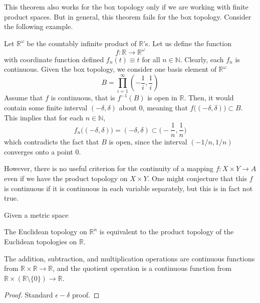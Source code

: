   This theorem also works for the box topology only if we are working with finite product spaces. But in general, this theorem fails for the box topology. Consider the following example. 

  \begin{example}
    Let $\mathbb{R}^\omega$ be the countably infinite product of $\mathbb{R}$'s. Let us define the function 
    \begin{equation}
      f: \mathbb{R} \rightarrow \mathbb{R}^\omega
    \end{equation}
    with coordinate function defined $f_n (t) \equiv t$ for all $n \in \mathbb{N}$. Clearly, each $f_n$ is continuous. Given the box topology, we consider one basis element of $\mathbb{R}^\omega$
    \begin{equation}
      B = \prod_{i=1}^\infty (-\frac{1}{i}, \frac{1}{i})
    \end{equation}
    Assume that $f$ is continuous, that is $f^{-1}(B)$ is open in $\mathbb{R}$. Then, it would contain some finite interval $(-\delta, \delta)$ about $0$, meaning that $f\big( (-\delta, \delta)\big) \subset B$. This implies that for each $n \in \mathbb{N}$, 
    \begin{equation}
      f_n \big( (-\delta, \delta) \big) = (-\delta, \delta) \subset \Big( -\frac{1}{n}, \frac{1}{n} \Big)
    \end{equation}
    which contradicts the fact that $B$ is open, since the interval $(-1/n, 1/n)$ converges onto a point $0$. 
  \end{example}

  However, there is no useful criterion for the continuity of a mapping $f: X \times Y \longrightarrow A$ even if we have the product topology on $X \times Y$. One might conjecture that this $f$ is continuous if it is continuous in each variable separately, but this is in fact not true. 

  \begin{theorem}
    Given a metric space
  \end{theorem}

  \begin{corollary}
    The Euclidean topology on $\mathbb{R}^n$ is equivalent to the product topology of the Euclidean topologies on $\mathbb{R}$. 
  \end{corollary}

  \begin{lemma}
    The addition, subtraction, and multiplication operations are continuous functions from $\mathbb{R} \times \mathbb{R} \longrightarrow \mathbb{R}$, and the quotient operation is a continuous function from $\mathbb{R} \times (\mathbb{R} \setminus \{0\}) \longrightarrow \mathbb{R}$. 
  \end{lemma}
  \begin{proof}
    Standard $\epsilon-\delta$ proof. 
  \end{proof}

